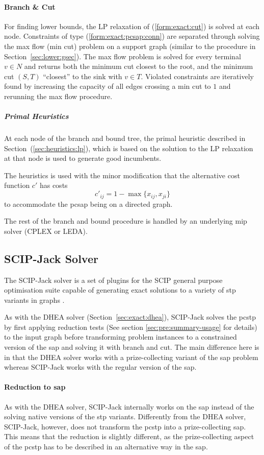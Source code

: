 \paragraph{Branch \& Cut}

For finding lower bounds, the LP relaxation of (\ref{form:exact:cut}) is solved at each node.
Constraints of type (\ref{form:exact:pcsap:conn}) are separated through solving the max flow (min cut)
problem on a support graph (similar to the procedure in Section~\ref{sec:lower:gsec}). 
The max flow problem is solved for every terminal $v \in N$ and returns both the minimum cut closest to
the root, and the minimum cut $(S,T)$ ``closest'' to the sink with $v \in T$.
Violated constraints are iteratively found by increasing the
capacity of all edges crossing a min cut to $1$ and rerunning the max flow procedure.

\subparagraph{Primal Heuristics}
At each node of the branch and bound tree, the primal heuristic described in Section~(\ref{sec:heuristics:lp}),
which is based on the solution to the LP relaxation at that node
is used to generate good incumbents.

The heuristics is used with the minor modification that the alternative cost function $c'$ has
costs
\[c'_{ij} = 1 - \max\{x_{ij}, x_{ji} \}\]
to accommodate the \gls{pcsap} being on a directed graph.

The rest of the branch and bound procedure is handled by an underlying \gls{mip} solver (CPLEX or LEDA).
\subsection{SCIP-Jack Solver}
\label{sec:exact:scipj}
The SCIP-Jack solver is a set of plugins for the SCIP general purpose optimisation suite capable
of generating exact solutions to a variety of \gls{stp} variants in graphs \cite{gamrath2017scip}.

As with the DHEA solver (Section~\ref{sec:exact:dhea}), SCIP-Jack solves the \gls{pcstp} by first applying
reduction tests (See section \ref{sec:pre:summary-usage} for details) to the input graph before transforming problem
instances to a constrained version of the \gls{sap} and solving it with branch and cut.
The main difference here is in that the DHEA solver works with a prize-collecting variant
 of the \gls{sap} problem whereas SCIP-Jack works with the regular version of the \gls{sap}.

\paragraph{Reduction to \gls{sap}}
As with the DHEA solver, SCIP-Jack internally works on the \gls{sap} instead of the solving native
versions of the \gls{stp} variants. Differently from the DHEA solver, SCIP-Jack, however, does not
transform the \gls{pcstp} into a prize-collecting \gls{sap}. This means that the reduction is slightly
different, as the prize-collecting aspect of the \gls{pcstp} has to be described in an alternative
way in the \gls{sap}.

